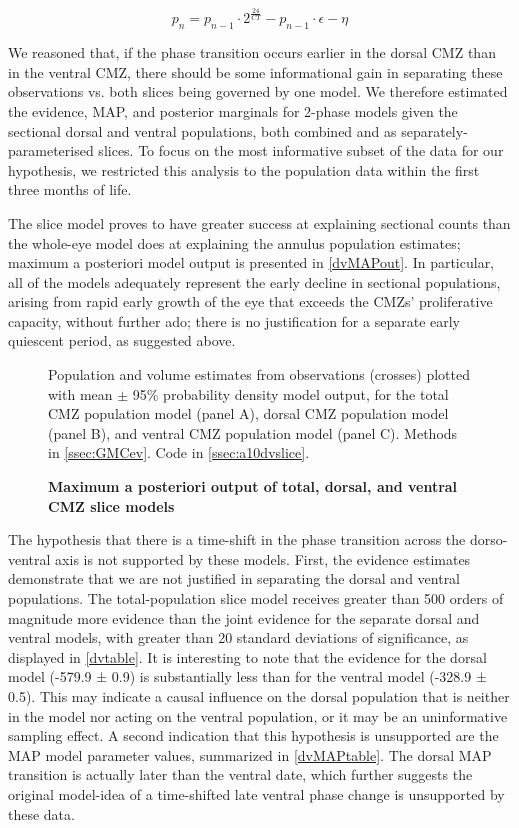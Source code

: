 \begin{equation}
    p_n=p_{n-1} \cdot 2^{\frac{24}{CT}} - p_{n-1} \cdot \epsilon - \eta
    \label{sliceeq}
\end{equation}

We reasoned that, if the phase transition occurs earlier in the dorsal CMZ than in the ventral CMZ, there should be some informational gain in separating these observations vs. both slices being governed by one model. We therefore estimated the evidence, MAP, and posterior marginals for 2-phase models given the sectional dorsal and ventral populations, both combined and as separately-parameterised slices. To focus on the most informative subset of the data for our hypothesis, we restricted this analysis to the population data within the first three months of life.

The slice model proves to have greater success at explaining sectional counts than the whole-eye model does at explaining the annulus population estimates; maximum a posteriori model output is presented in \autoref{dvMAPout}. In particular, all of the models adequately represent the early decline in sectional populations, arising from rapid early growth of the eye that exceeds the CMZs' proliferative capacity, without further ado; there is no justification for a separate early quiescent period, as suggested above.

\begin{figure}[!h]
    \caption{{\bf Maximum a posteriori output of total, dorsal, and ventral CMZ slice models}}
    \label{dvMAPout}
    Population and volume estimates from observations (crosses) plotted with mean $\pm$ 95\% probability density model output, for the total CMZ population model (panel A), dorsal CMZ population model (panel B), and ventral CMZ population model (panel C).
    Methods in \autoref{ssec:GMCev}.
    Code in \autoref{ssec:a10dvslice}. 
\end{figure}

The hypothesis that there is a time-shift in the phase transition across the dorso-ventral axis is not supported by these models. First, the evidence estimates demonstrate that we are not justified in separating the dorsal and ventral populations. The total-population slice model receives greater than 500 orders of magnitude more evidence than the joint evidence for the separate dorsal and ventral models, with greater than 20 standard deviations of significance, as displayed in \autoref{dvtable}. It is interesting to note that the evidence for the dorsal model (-579.9 ± 0.9) is substantially less than for the ventral model (-328.9 ± 0.5). This may indicate a causal influence on the dorsal population that is neither in the model nor acting on the ventral population, or it may be an uninformative sampling effect. A second indication that this hypothesis is unsupported are the MAP model parameter values, summarized in \autoref{dvMAPtable}. The dorsal MAP transition is actually later than the ventral date, which further suggests the original model-idea of a time-shifted late ventral phase change is unsupported by these data.

